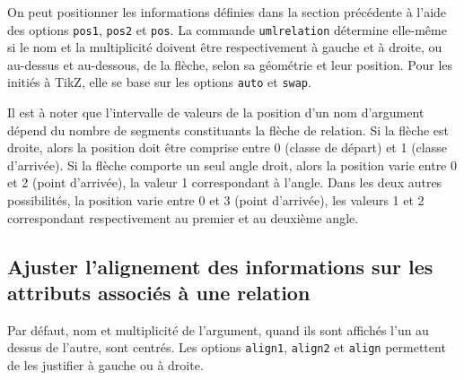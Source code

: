 \documentclass[a4paper,11pt]{report}
\newcommand{\inputTikZ}[1]{%
  }%
\newcommand{\inputTikZ}[1]{%
    \texttt{[image: fig/\#1.pdf]}%
  }%
\newcommand{\TikZ}{{\sc TikZ}}
\begin{document}
On peut positionner les informations définies dans la section précédente à l'aide des options {\tt pos1}, {\tt pos2} et {\tt pos}.
La commande {\tt umlrelation} détermine elle-même si le nom et la multiplicité doivent être respectivement à gauche et à droite, ou au-dessus et au-dessous, de la flèche, selon sa géométrie et leur position. Pour les initiés à \TikZ, elle se base sur les options {\tt auto} et {\tt swap}.

\medskip

\begin{minipage}{0.5\textwidth}

\end{minipage}
\begin{minipage}{0.4\textwidth}
\begin{center}
\inputTikZ{figure17}
\end{center}
\end{minipage}

\medskip

Il est à noter que l'intervalle de valeurs de la position d'un nom d'argument dépend du nombre de segments constituants la flèche de relation. Si la flèche est droite, alors la position doit être comprise entre 0 (classe de départ) et 1 (classe d'arrivée). Si la flèche comporte un seul angle droit, alors la position varie entre 0 et 2 (point d'arrivée), la valeur 1 correspondant à l'angle. Dans les deux autres possibilités, la position varie entre 0 et 3 (point d'arrivée), les valeurs 1 et 2 correspondant respectivement au premier et au deuxième angle.

\subsection{Ajuster l'alignement des informations sur les attributs associés à une relation}\label{ss.relalign}

Par défaut, nom et multiplicité de l'argument, quand ils sont affichés l'un au dessus de l'autre, sont centrés. Les options {\tt align1}, {\tt align2} et {\tt align} permettent de les justifier à gauche ou à droite.

\medskip

\begin{minipage}{0.5\textwidth}

\end{minipage}
\begin{minipage}{0.4\textwidth}
\begin{center}
\inputTikZ{figure18}
\end{center}
\end{minipage}
\end{document}
